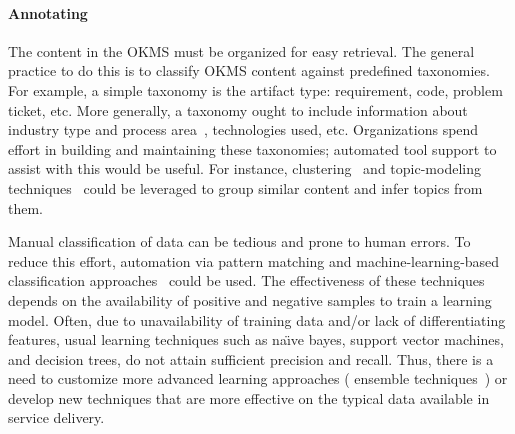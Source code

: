 \vskip -5pt
\paragraph*{Annotating}
The content in the OKMS must be organized for easy retrieval. The general
practice to do this is to classify OKMS content against predefined
taxonomies. For example, a simple taxonomy is the artifact type: requirement,
code, problem ticket, etc. More generally, a taxonomy ought to include
information about industry type and process area~\cite{apqc,bph}, technologies
used, etc. Organizations spend effort in building and maintaining these
taxonomies; automated tool support to assist with this would be useful. For
instance, clustering~\cite{Berkhin06} and topic-modeling
techniques~\cite{Blei:2012} could be leveraged to group similar content and
infer topics from them.

Manual classification of data can be tedious and prone to human errors. To
reduce this effort, automation via pattern matching and machine-learning-based
classification approaches~\cite{bishop2006pattern} could be used.  The
effectiveness of these techniques depends on the availability of positive and
negative samples to train a learning model. Often, due to unavailability of
training data and/or lack of differentiating features, usual learning techniques
such as na\"{\i}ve bayes, support vector machines, and decision
trees, do not attain sufficient precision and recall. Thus, there is a
need to customize more advanced learning approaches (\eg
ensemble techniques~\cite{Dietterich:2000}) or develop new techniques that are more effective
on the typical data available in service delivery.



